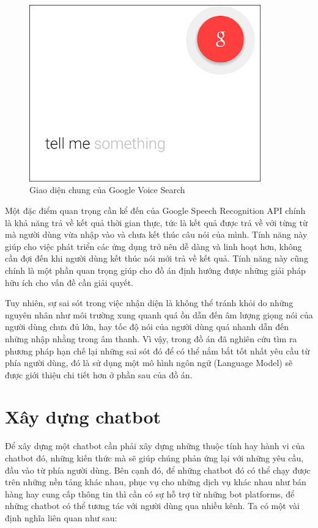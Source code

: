 \documentclass[12pt]{report}
\begin{document}
\begin{figure}[H]
  \centering
    \includegraphics[width=10cm]{Pics/Chap2/google-voice.png}
  \caption{Giao diện chung của Google Voice Search}
\end{figure}

Một đặc điểm quan trọng cần kể đến của Google Speech Recognition API chính là khả năng trả về kết quả thời gian thực, tức là kết quả được trả về với từng từ mà người dùng vừa nhập vào và chưa kết thúc câu nói của mình. Tính năng này giúp cho việc phát triển các ứng dụng trở nên dễ dàng và linh hoạt hơn, không cần đợi đến khi người dùng kết thúc nói mới trả về kết quả. Tính năng này cũng chính là một phần quan trọng giúp cho đồ án định hướng được những giải pháp hữu ích cho vấn đề cần giải quyết.

Tuy nhiên, sự sai sót trong việc nhận diện là không thể tránh khỏi do những nguyên nhân như môi trường xung quanh quá ồn dẫn đến âm lượng giọng nói của người dùng chưa đủ lớn, hay tốc độ nói của người dùng quá nhanh dẫn đến những nhập nhằng trong âm thanh. Vì vậy, trong đồ án đã nghiên cứu tìm ra phương pháp hạn chế lại những sai sót đó để có thể nắm bắt tốt nhất yêu cầu từ phía người dùng, đó là sử dụng một mô hình ngôn ngữ (Language Model) sẽ được giới thiệu chi tiết hơn ở phần sau của đồ án.

\section{Xây dựng chatbot}

Để xây dựng một chatbot cần phải xây dựng những thuộc tính hay hành vi của chatbot đó, những kiến thức mà sẽ giúp chúng phản ứng lại với những yêu cầu, đầu vào từ phía người dùng. Bên cạnh đó, để những chatbot đó có thể chạy được trên những nền tảng khác nhau, phục vụ cho những dịch vụ khác nhau như bán hàng hay cung cấp thông tin thì cần có sự hỗ trợ từ những bot platforms, để những chatbot có thể tương tác với người dùng qua nhiều kênh. Ta có một vài định nghĩa liên quan như sau:
\end{document}
